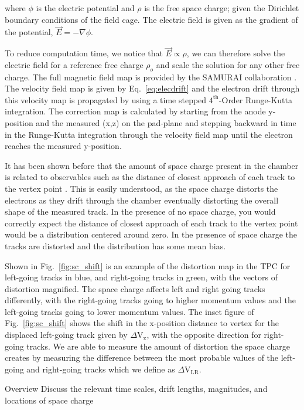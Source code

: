  where $\phi$ is the electric potential and $\rho$ is the free space charge; given the Dirichlet boundary conditions of the field cage. The electric field is given as the gradient of the potential,  $\vec{E}= -\nabla \phi$. 
 
 To reduce computation time, we notice that $\vec{E}\propto \rho$, we can therefore solve the electric field for a reference free charge $\rho_o$ and scale the solution for any other free charge. The full magnetic field map is provided by the SAMURAI collaboration \cite{magnet}. The velocity field map is given by Eq.~\ref{eq:elecdrift} and the electron drift through this velocity map is propagated by using a time stepped $\mathrm{4}^{\mathrm{th}}$-Order Runge-Kutta integration. The correction map is calculated by starting from the anode y-position and the measured (x,z) on the pad-plane and stepping backward in time in the Runge-Kutta integration through the velocity field map until the electron reaches the measured y-position. 
 
 It has been shown before that the amount of space charge present in the chamber is related to observables such as the distance of closest approach of each track to the vertex point \cite{starSC}. This is easily understood, as the space charge distorts the electrons as they drift through the chamber eventually distorting the overall shape of the measured track. In the presence of no space charge, you would correctly expect the distance of closest approach of each track to the vertex point would be a distribution centered around zero. In the presence of space charge the tracks are distorted and the distribution has some mean bias. 

Shown in Fig.~\ref{fig:sc_shift} is an example of the distortion map in the TPC for left-going tracks in blue, and right-going tracks in green, with the vectors of distortion magnified. The space charge affects left and right going tracks differently, with the right-going tracks going to higher momentum values and the left-going tracks going to lower momentum values. The inset figure of Fig.~\ref{fig:sc_shift} shows the shift in the x-position distance to vertex for the displaced left-going track given by $\Delta\mathrm{V}_\mathrm{x}$, with the opposite direction for right-going tracks. We are able to measure the amount of distortion the space charge creates by measuring the difference between the most probable values of the left-going and right-going tracks which we define as $\Delta\mathrm{V}_\mathrm{LR}$.
 

Overview
Discuss the relevant time scales, drift lengths, magnitudes, and locations of space charge


